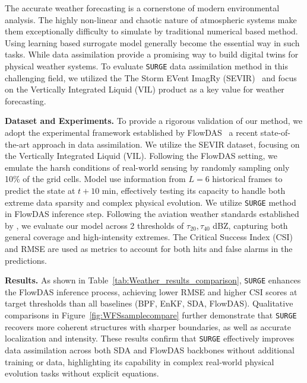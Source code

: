 \documentclass{article}
\theoremstyle{plain}
\theoremstyle{definition}
\theoremstyle{remark}
\begin{document}
The accurate weather forecasting is a cornerstone of modern environmental analysis. The highly non-linear and chaotic nature of atmospheric systems make them exceptionally difficulty to simulate by traditional numerical based method. Using learning based surrogate model generally become the essential way in such tasks. While data assimilation provide a promising way to build digital twins for physical weather systems. To evaluate \texttt{SURGE} data assimilation method in this challenging field, we utilized the The Storm EVent ImagRy (SEVIR)~\cite{veillette2020sevir} and focus on the Vertically Integrated Liquid (VIL) product as a key value for weather forecasting. 

\textbf{Dataset and Experiments.} To provide a rigorous validation of our method, we adopt the experimental framework established by FlowDAS~\cite{chen2025flowdas} a recent state-of-the-art approach in data assimilation. We utilize the SEVIR dataset, focusing on the Vertically Integrated Liquid (VIL). Following the FlowDAS setting, we emulate the harsh conditions of real-world sensing by randomly sampling only 10\% of the grid cells. Model use information from $L=6$ historical frames to predict the state at $t+10$ min, effectively testing its capacity to handle both extreme data sparsity and complex physical evolution.
We utilize \texttt{SURGE} method in FlowDAS inference step. Following the aviation weather standards established by \cite{robinson2002route}, we evaluate our model across 2 thresholds of $\tau_{20}, \tau_{40}$ dBZ, capturing both general coverage and high-intensity extremes. The Critical Success Index (CSI) and RMSE are used as metrics to account for both hits and false alarms in the predictions.

\textbf{Results.} As shown in Table~\ref{tab:Weather_results_comparison}, \texttt{SURGE} enhances the FlowDAS inference process, achieving lower RMSE and higher CSI scores at target thresholds than all baselines (BPF, EnKF, SDA, FlowDAS). Qualitative comparisons in Figure~\ref{fig:WFSsamplecompare} further demonstrate that \texttt{SURGE} recovers more coherent structures with sharper boundaries, as well as accurate localization and intensity. These results confirm that \texttt{SURGE} effectively improves data assimilation across both SDA and FlowDAS backbones without additional training or data, highlighting its capability in complex real-world physical evolution tasks without explicit equations.
\end{document}
